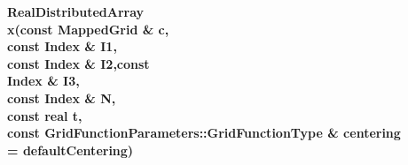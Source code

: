  
\begin{flushleft} \textbf{%
RealDistributedArray  \\ 
\settowidth{\OGFunctionIncludeArgIndent}{x(}%
x(const MappedGrid \& c, \\ 
\hspace{\OGFunctionIncludeArgIndent}const Index \& I1,\\ 
\hspace{\OGFunctionIncludeArgIndent}const Index \& I2,const\\ 
\hspace{\OGFunctionIncludeArgIndent}Index \& I3, \\ 
\hspace{\OGFunctionIncludeArgIndent}const Index \& N, \\ 
\hspace{\OGFunctionIncludeArgIndent}const real t,\\ 
\hspace{\OGFunctionIncludeArgIndent}const GridFunctionParameters::GridFunctionType \& centering \\ 
\hspace{\OGFunctionIncludeArgIndent}= defaultCentering)
}\end{flushleft}
